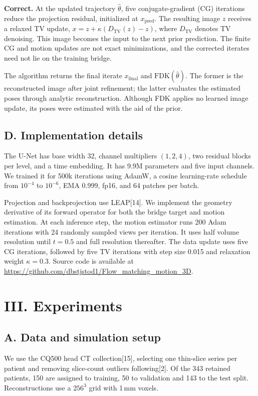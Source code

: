 \documentclass[11pt]{article}
\newcommand{\FDK}{\mathrm{FDK}}
\newcommand{\thetahat}{\hat\theta}
\begin{document}
\textbf{Correct.} At the updated trajectory $\thetahat$, five conjugate-gradient
(CG) iterations reduce the projection residual, initialized at $x_{\mathrm{pred}}$.
The resulting image $z$ receives a relaxed TV update,
$x=z+\kappa(D_{\mathrm{TV}}(z)-z)$, where $D_{\mathrm{TV}}$ denotes TV denoising.
This image becomes the input to the next prior prediction. The finite CG and motion
updates are not exact minimizations, and the corrected iterates need not lie on the
training bridge.

The algorithm returns the final iterate $x_{\mathrm{final}}$ and
$\FDK(\thetahat)$. The former is the reconstructed image after joint refinement;
the latter evaluates the estimated poses through analytic reconstruction. Although
FDK applies no learned image update, its poses were estimated with the aid of the prior.

\subsection{D. Implementation details}


The U-Net has base width 32, channel multipliers $(1,2,4)$, two residual blocks per
level, and a time embedding. It has 9.9M parameters and five input channels. We trained
it for 500k iterations using AdamW, a cosine learning-rate schedule from $10^{-4}$ to
$10^{-6}$, EMA 0.999, fp16, and 64 patches per batch.

Projection and backprojection use LEAP[14]. We implement the geometry
derivative of its forward operator for both the bridge target and motion estimation.
At each inference step, the motion estimator runs 200 Adam iterations with 24 randomly
sampled views per iteration. It uses half volume resolution until $t=0.5$ and full
resolution thereafter. The data update uses five CG iterations, followed by five TV
iterations with step size 0.015 and relaxation weight $\kappa=0.3$.
Source code is available at \url{https://github.com/dbstjstod1/Flow_matching_motion_3D}.

\section{III. Experiments}


\subsection{A. Data and simulation setup}


We use the CQ500 head CT collection[15], selecting one thin-slice series per
patient and removing slice-count outliers following[2]. Of the 343
retained patients, 150 are assigned to training, 50 to validation and 143 to the test
split. Reconstructions use a $256^3$ grid with 1\,mm voxels.
\end{document}
